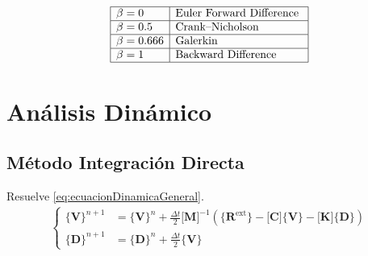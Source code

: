 \documentclass[11pt, a4paper,titlepage]{article}
\newcommand{\Mme}[1]{\boldsymbol{[}\mathbf{#1} \boldsymbol{]}}
\newcommand{\Cme}[1]{\boldsymbol{\{ }\mathbf{#1} \boldsymbol{\}} }
\newcommand{\MK}{\Mme{K}}
\newcommand{\MC}{\Mme{C}}
\begin{document}
\[
\begin{array}{|l|l|}\hline \beta=0 & {\text {Euler Forward Difference }} \\ \hline \beta=0.5 & {\text {Crank--Nicholson }} \\ \hline \beta=0.666 & {\text {Galerkin }} \\ \hline \beta=1 & {\text {Backward Difference }} \\ \hline\end{array}
\]

\section{Análisis Dinámico}

\subsection*{Método Integración Directa}
Resuelve \ref{eq:ecuacionDinamicaGeneral}.
\begin{align*}
	\begin{cases}
	\Cme{V}^{n+1}&=\Cme{V}^n + \frac{\Delta t}{2}  \Mme{M}^{-1}\left(\Cme{R^{\mathrm{ext}}} - \MC \Cme{V} - \MK \Cme{D} \right) \\
	\Cme{D}^{n+1}&=\Cme{D}^n + \frac{\Delta t}{2} \Cme{V}
	\end{cases}
\end{align*}
\end{document}
